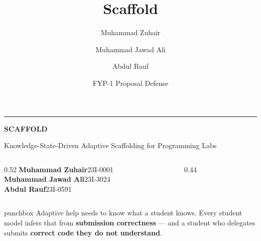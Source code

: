 \documentclass[aspectratio=169,11pt]{beamer}
\title[Scaffold]{Scaffold}
\author[Zuhair, Jawad, Rauf]{Muhammad Zuhair \and Muhammad Jawad Ali \and Abdul Rauf}
\institute[FAST NUCES]{FAST NUCES Islamabad}
\date{FYP-1 Proposal Defense}
\begin{document}
\begin{frame}[plain]
  \vspace{1.0cm}
  {\color{accent}\rule{2.6cm}{2.2pt}}\par\vspace{0.5em}
  {\fontsize{34}{38}\selectfont\bfseries\color{ink}SCAFFOLD}\par\vspace{0.35em}
  {\large\color{muted}Knowledge-State-Driven Adaptive Scaffolding for Programming Labs}\par
  \vspace{1.0cm}

  \begin{columns}[T]
    \begin{column}{0.52\textwidth}
      {\footnotesize
      \textbf{Muhammad Zuhair}\;\textcolor{muted}{23I-0001}\\[0.15em]
      \textbf{Muhammad Jawad Ali}\;\textcolor{muted}{23I-3024}\\[0.15em]
      \textbf{Abdul Rauf}\;\textcolor{muted}{23I-0591}}
    \end{column}
    \begin{column}{0.44\textwidth}
    \end{column}
  \end{columns}

  \vspace{0.7cm}
  \begin{beamercolorbox}[wd=\textwidth,sep=9pt,rounded=true]{punchbox}
    Adaptive help needs to know what a student knows. Every student model infers that
    from \textbf{submission correctness} --- and a student who delegates submits
    \textbf{correct code they do not understand}.
  \end{beamercolorbox}
\end{frame}
\end{document}

